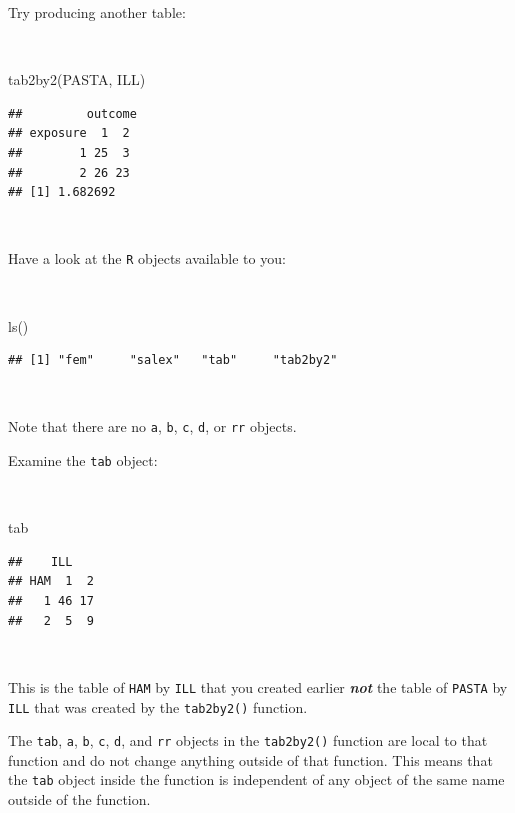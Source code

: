 \documentclass[
  12pt,
]{book}
\newenvironment{Shaded}{\begin{snugshade}}{\end{snugshade}}
\newcommand{\FunctionTok}[1]{\textcolor[rgb]{0.00,0.00,0.00}{#1}}
\newcommand{\NormalTok}[1]{#1}
\begin{document}
Try producing another table:

~

\begin{Shaded}
\begin{Highlighting}[]
\FunctionTok{tab2by2}\NormalTok{(PASTA, ILL)}
\end{Highlighting}
\end{Shaded}

\begin{verbatim}
##         outcome
## exposure  1  2
##        1 25  3
##        2 26 23
## [1] 1.682692
\end{verbatim}

~

Have a look at the \texttt{R} objects available to you:

~

\begin{Shaded}
\begin{Highlighting}[]
\FunctionTok{ls}\NormalTok{()}
\end{Highlighting}
\end{Shaded}

\begin{verbatim}
## [1] "fem"     "salex"   "tab"     "tab2by2"
\end{verbatim}

~

Note that there are no \texttt{a}, \texttt{b}, \texttt{c}, \texttt{d}, or \texttt{rr} objects.

\newpage

Examine the \texttt{tab} object:

~

\begin{Shaded}
\begin{Highlighting}[]
\NormalTok{tab}
\end{Highlighting}
\end{Shaded}

\begin{verbatim}
##    ILL
## HAM  1  2
##   1 46 17
##   2  5  9
\end{verbatim}

~

This is the table of \texttt{HAM} by \texttt{ILL} that you created earlier \textbf{\emph{not}} the table of \texttt{PASTA} by \texttt{ILL} that was created by the \texttt{tab2by2()} function.

The \texttt{tab}, \texttt{a}, \texttt{b}, \texttt{c}, \texttt{d}, and \texttt{rr} objects in the \texttt{tab2by2()} function are local to that function and do not change anything outside of that function. This means that the \texttt{tab} object inside the function is independent of any object of the same name outside of the function.
\end{document}
